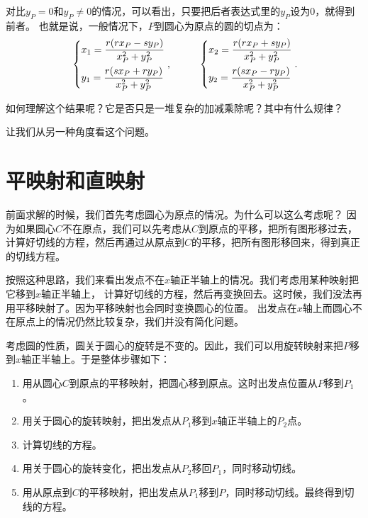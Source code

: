\documentclass[12pt,UTF8]{ctexbook}
\begin{document}
对比$y_P=0$和$y_P\neq 0$的情况，可以看出，只要把后者表达式里的$y_P$设为$0$，就得到前者。
也就是说，一般情况下，$P$到圆心为原点的圆的切点为：
\begin{alignat*}{2}
    &   \begin{dcases}
        x_1 = \frac{r(rx_P - sy_P) }{x_P^2+y_P^2} \\
        y_1 = \frac{r(sx_P + ry_P)}{x_P^2+y_P^2}
      \end{dcases}
    ,& \quad\quad
      \begin{dcases}
        x_2 = \frac{r(rx_P + sy_P) }{x_P^2+y_P^2} \\
        y_2 = \frac{r(sx_P - ry_P)}{x_P^2+y_P^2}
      \end{dcases}
    .
\end{alignat*}

如何理解这个结果呢？它是否只是一堆复杂的加减乘除呢？其中有什么规律？

让我们从另一种角度看这个问题。

\section{平映射和直映射}
前面求解的时候，我们首先考虑圆心为原点的情况。为什么可以这么考虑呢？
因为如果圆心$C$不在原点，我们可以先考虑从$C$到原点的平移，把所有图形移过去，
计算好切线的方程，然后再通过从原点到$C$的平移，把所有图形移回来，得到真正的切线方程。

按照这种思路，我们来看出发点不在$x$轴正半轴上的情况。我们考虑用某种映射把它移到$x$轴正半轴上，
计算好切线的方程，然后再变换回去。这时候，我们没法再用平移映射了。因为平移映射也会同时变换圆心的位置。
出发点在$x$轴上而圆心不在原点上的情况仍然比较复杂，我们并没有简化问题。

考虑圆的性质，圆关于圆心的旋转是不变的。因此，我们可以用旋转映射来把$P$移到$x$轴正半轴上。于是整体步骤如下：

\begin{enumerate}
    \item 用从圆心$C$到原点的平移映射，把圆心移到原点。这时出发点位置从$P$移到$P_1$。
    \item 用关于圆心的旋转映射，把出发点从$P_1$移到$x$轴正半轴上的$P_2$点。
    \item 计算切线的方程。
    \item 用关于圆心的旋转变化，把出发点从$P_2$移回$P_1$，同时移动切线。
    \item 用从原点到$C$的平移映射，把出发点从$P_1$移到$P$，同时移动切线。最终得到切线的方程。
\end{enumerate}
\end{document}
